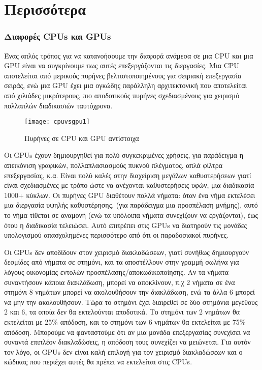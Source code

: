 \chapter{Περισσότερα}

\subsection{Διαφορές CPUs και GPUs}

Ένας απλός τρόπος για να κατανοήσουμε την διαφορά ανάμεσα σε μια CPU και μια GPU είναι να συγκρίνουμε πως αυτές επεξεργάζονται τις διεργασίες. Μια CPU αποτελείται από μερικούς πυρήνες βελτιστοποιημένους για σειριακή επεξεργασία σειράς, ενώ μια GPU έχει μια ογκώδης παράλληλη αρχιτεκτονική που αποτελείται από χιλιάδες μικρότερους, πιο αποδοτικούς πυρήνες σχεδιασμένους για χειρισμό πολλαπλών διαδικασιών ταυτόχρονα.

\begin{figure}[h]
\centering
\texttt{[image: cpuvsgpu1]}
\caption{Πυρήνες σε CPU και GPU αντίστοιχα}
\end{figure}

Οι GPUs έχουν δημιουργηθεί για πολύ συγκεκριμένες χρήσεις, για παράδειγμα η απεικόνιση γραφικών, πολλαπλασιασμούς πυκνού πλέγματος, απλά φίλτρα επεξεργασίας, κ.α. Είναι πολύ καλές στην διαχείριση μεγάλων καθυστερήσεων γιατί είναι σχεδιασμένες με τρόπο ώστε να ανέχονται καθυστερήσεις υφών, μια διαδικασία 1000+ κύκλων. Οι πυρήνες GPU διαθέτουν πολλά νήματα: όταν ένα νήμα εκτελέσει μια διεργασία υψηλής καθυστέρησης, (για παράδειγμα μια προσπέλαση μνήμης), αυτό το νήμα τίθεται σε αναμονή (ενώ τα υπόλοιπα νήματα συνεχίζουν να εργάζονται), έως ότου η διαδικασία τελειώσει. Αυτό επιτρέπει στις GPUs να διατηρούν τις μονάδες υπολογισμού απασχολημένες περισσότερο από ότι οι παραδοσιακοί πυρήνες.

Οι GPUs δεν αποδίδουν στον χειρισμό διακλαδώσεων, γιατί συνήθως δημιουργούν δεσμίδες από νήματα σε στημόνι, και τα αποστέλλουν στην γραμμή σωλήνα για λόγους οικονομίας εντολών προσπέλασης/αποκωδικοποίησης. Αν τα νήματα συναντήσουν κάποια διακλάδωση, μπορεί να αποκλίνουν, π.χ 2 νήματα σε ένα στημόνι 8 νημάτων μπορεί να ακολουθήσουν την διακλάδωση, ενώ τα άλλα 6 μπορεί να μην την ακολουθήσουν. Τώρα το στημόνι έχει διαιρεθεί σε δύο στημόνια μεγέθους 2 και 6, τα οποία δεν θα εκτελούνται αποδοτικά. Το στημόνι των 2 νημάτων θα εκτελείται με 25\% απόδοση, και το στημόνι των 6 νημάτων θα εκτελείται με 75\% απόδοση. Μπορούμε να φανταστούμε ότι αν μια μονάδα επεξεργασίας συνεχίσει να συναντά επιπλέον διακλαδώσεις, η απόδοση τους συνεχίζει να μειώνεται. Για αυτόν τον λόγο, οι GPUs δεν είναι καλή επιλογή για τον χειρισμό διακλαδώσεων και ο κώδικας που περιέχει αυτές θα πρέπει να εκτελείται στις CPUs.


